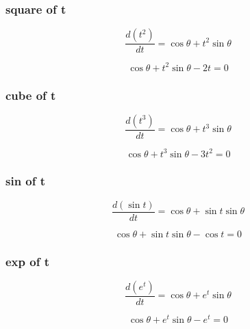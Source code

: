\documentclass{article}
\begin{document}
\subsubsection{square of t}

\begin{equation}
    \frac{d(t^2)}{dt} = \cos \theta + t^2 \sin \theta
\end{equation}

\begin{equation}
    \cos \theta + t^2 \sin \theta - 2 t = 0
\end{equation}

\subsubsection{cube of t}

\begin{equation}
    \frac{d(t^3)}{dt} = \cos \theta + t^3 \sin \theta
\end{equation}

\begin{equation}
    \cos \theta + t^3 \sin \theta - 3 t^2 = 0
\end{equation}

\subsubsection{sin of t}

\begin{equation}
    \frac{d(\sin t)}{dt} = \cos \theta + \sin t \sin \theta
\end{equation}

\begin{equation}
     \cos \theta + \sin t \sin \theta - \cos t = 0
\end{equation}

\subsubsection{exp of t}

\begin{equation}
    \frac{d(e^t)}{dt} = \cos \theta + e^t \sin \theta
\end{equation}

\begin{equation}
     \cos \theta + e^t \sin \theta - e^t = 0
\end{equation}
\end{document}
